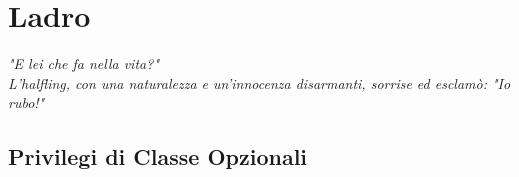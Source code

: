 \chapter{Ladro}

\begin{DndReadAloud}
  \it
  "E lei che fa nella vita?" \\ L'halfling, con una naturalezza e un'innocenza disarmanti, sorrise ed esclamò: "Io rubo!"
\end{DndReadAloud}

\section{Privilegi di Classe Opzionali}
